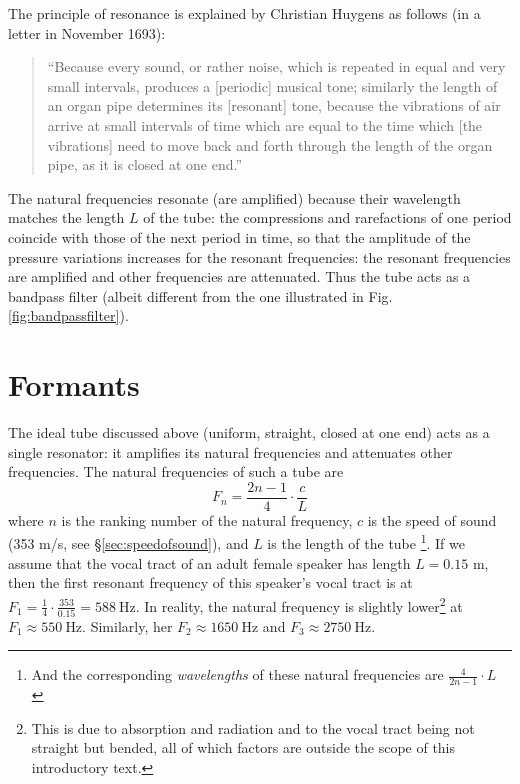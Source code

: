 \documentclass[
]{book}
\begin{document}
The principle of resonance is explained by Christian Huygens as follows (in a letter in November 1693):

\begin{quote}
``Because every sound, or rather noise, which is repeated in equal and very small intervals, produces a {[}periodic{]} musical tone; similarly the length of an organ pipe determines its {[}resonant{]} tone, because the vibrations of air arrive at small intervals of time which are equal to the time which {[}the vibrations{]} need to move back and forth through the length of the organ pipe, as it is closed at one end.'' \citep[571, transl. HQ]{Huygens_1905}
\end{quote}

The natural frequencies resonate (are amplified) because their wavelength matches the length \(L\) of the tube: the compressions and rarefactions of one period coincide with those of the next period in time, so that the amplitude of the pressure variations increases for the resonant frequencies: the resonant frequencies are amplified and other frequencies are attenuated. Thus the tube acts as a bandpass filter (albeit different from the one illustrated in Fig.\ref{fig:bandpassfilter}).

\section{Formants}\label{formants}

The ideal tube discussed above (uniform, straight, closed at one end) acts as a single resonator: it amplifies its natural frequencies and attenuates other frequencies. The natural frequencies of such a tube are
\[F_n = \frac{2n-1}{4} \cdot \frac{c}{L}\]
where \(n\) is the ranking number of the natural frequency, \(c\) is the speed of sound (353 m/s, see §\ref{sec:speedofsound}), and \(L\) is the length of the tube \citep[139]{Stevens_1998} \footnote{And the corresponding \emph{wavelengths} of these natural frequencies are \(\frac{4}{2n-1}\cdot L\) \citep[60]{Nooteboom_Cohen_1984}}.
If we assume that the vocal tract of an adult female speaker has length \(L=0.15\) m, then the first resonant frequency of this speaker's vocal tract is at \(F_1 = \frac{1}{4} \cdot \frac{353}{0.15} = 588\ \textrm{Hz}\). In reality, the natural frequency is slightly lower\footnote{This is due to absorption and radiation and to the vocal tract being not straight but bended, all of which factors are outside the scope of this introductory text.} at \(F_1 \approx 550\ \textrm{Hz}\).
Similarly, her \(F_2 \approx 1650\ \textrm{Hz}\) and \(F_3 \approx 2750\ \textrm{Hz}\).
\end{document}
